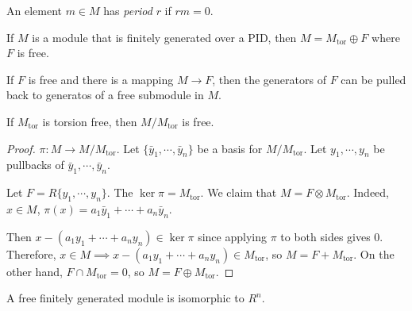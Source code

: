 \documentclass[a4paper,twoside,master.tex]{subfiles}
\begin{document}

\begin{definition}
    An element $ m \in M $ has \textit{period} $ r $ if $ rm = 0 $.
\end{definition}

\begin{theorem}
    If $ M $ is a module that is finitely generated over a PID, then $ M = M_{\text{tor}} \oplus F $ where $ F $ is free.
\end{theorem}
\begin{lemma}
    If $ F $ is free and there is a mapping $ M \to F $, then the generators of $ F $ can be pulled back to generatos of a free submodule in $ M $.
\end{lemma}
\begin{lemma}
    If $ M_{\text{tor}} $ is torsion free, then $ M/M_{\text{tor}} $ is free.
\end{lemma}
\begin{proof}
    $ \pi\colon M \to M / M_{\text{tor}} $. Let $ \{\bar{y}_1, \cdots, \bar{y}_n\} $ be a basis for $ M/M_{\text{tor}} $. Let $ y_1, \cdots, y_n $ be pullbacks of $ \bar{y}_1, \cdots, \bar{y}_n $. 

    Let $ F = R \{y_1, \cdots, y_n\} $. The $ \ker \pi = M_{\text{tor}} $. We claim that $ M = F \otimes M_{\text{tor}} $. Indeed, $ x \in M $, $ \pi(x) = a_1 \bar{y}_1 + \cdots + a_n \bar{y}_n $.

    Then $ x - (a_1 y_1 + \cdots + a_n y_n) \in \ker \pi $ since applying $ \pi $ to both sides gives $ 0 $. Therefore, $ x \in M \implies x - (a_1 y_1 + \cdots + a_n y_n) \in M_{\text{tor}} $, so $ M = F + M_{\text{tor}} $. On the other hand, $ F \cap M_{\text{tor}} = 0 $, so $ M = F \oplus M_{\text{tor}} $.
\end{proof}

A free finitely generated module is isomorphic to $ R^n $.
\end{document}
